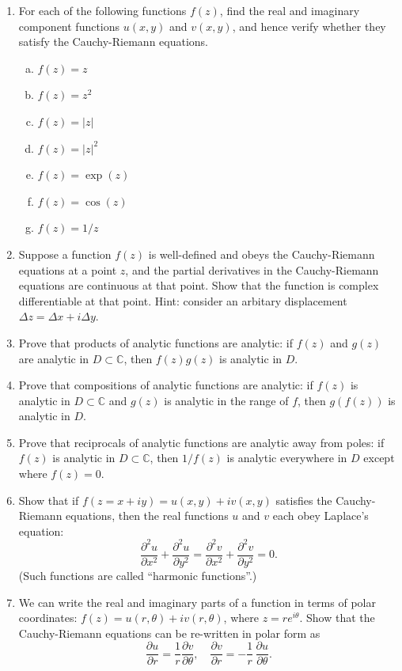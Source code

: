 \documentclass[10pt,a4paper]{article}
\begin{document}
\begin{enumerate}
\item
  For each of the following functions $f(z)$, find the real and
  imaginary component functions $u(x,y)$ and $v(x,y)$, and hence
  verify whether they satisfy the Cauchy-Riemann equations.

  \begin{enumerate}[(a)]
  \item $f(z) = z$
  \item $f(z) = z^2$
  \item $f(z) = |z|$
  \item $f(z) = |z|^2$
  \item $f(z) = \exp(z)$
  \item $f(z) = \cos(z)$
  \item $f(z) = 1/z$
  \end{enumerate}

\item
  Suppose a function $f(z)$ is well-defined and obeys the
  Cauchy-Riemann equations at a point $z$, and the partial derivatives
  in the Cauchy-Riemann equations are continuous at that point. Show
  that the function is complex differentiable at that point. Hint:
  consider an arbitary displacement
  $\Delta z = \Delta x + i \Delta y$.

\item
  Prove that products of analytic functions are analytic: if $f(z)$
  and $g(z)$ are analytic in $D \subset \mathbb{C}$, then
  $f(z) g(z)$ is analytic in $D$.

\item
  Prove that compositions of analytic functions are analytic: if
  $f(z)$ is analytic in $D \subset \mathbb{C}$ and $g(z)$ is
  analytic in the range of $f$, then $g(f(z))$ is analytic in $D$.

\item
  Prove that reciprocals of analytic functions are analytic away from
  poles: if $f(z)$ is analytic in $D \subset \mathbb{C}$, then
  $1/f(z)$ is analytic everywhere in $D$ except where $f(z) = 0$.

\item
  Show that if $f(z = x + iy) = u(x,y) + i v(x,y)$ satisfies the
  Cauchy-Riemann equations, then the real functions $u$ and $v$ each
  obey Laplace's equation:
  \begin{equation}
    \frac{\partial^2 u}{\partial x^2} + \frac{\partial^2u}{\partial y^2} = \frac{\partial^2 v}{\partial x^2} + \frac{\partial^2 v}{\partial y^2} = 0.
  \end{equation}
  (Such functions are called ``harmonic functions''.)

\item
  We can write the real and imaginary parts of a function in terms of
  polar coordinates: $f(z) = u(r,\theta) + i v(r,\theta)$, where $z =
  re^{i\theta}$.  Show that the Cauchy-Riemann equations can be
  re-written in polar form as
  \begin{equation}
    \frac{\partial u}{\partial r} =  \frac{1}{r} \frac{\partial v}{\partial \theta}, \quad \frac{\partial v}{\partial r} =  - \frac{1}{r}\,  \frac{\partial u}{\partial \theta}.
  \end{equation}
\end{enumerate}
\end{document}

